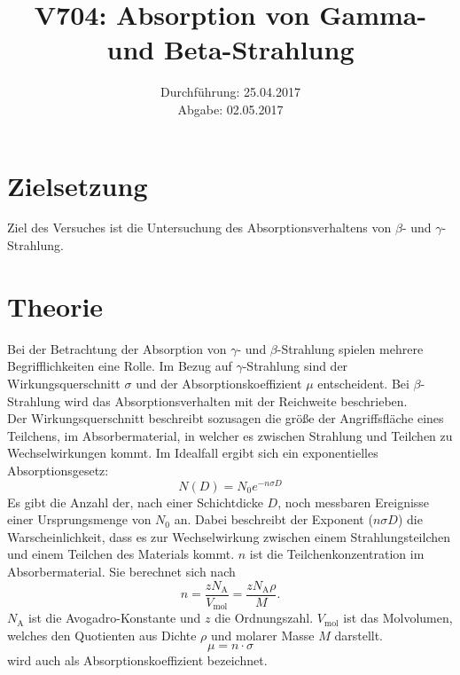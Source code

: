 \documentclass[
  bibliography=totoc,     %
  captions=tableheading,  %
  titlepage=firstiscover, %
]{scrartcl}
\title{V704: Absorption von Gamma- und Beta-Strahlung}
\author{
  Simon Schulte
  \texorpdfstring{
    \\
    \href{mailto:simon.schulte@udo.edu}{simon.schulte@udo.edu}
  }{}
  \texorpdfstring{\and}{, }
  Tim Sedlaczek
  \texorpdfstring{
    \\
    \href{mailto:tim.sedlaczek@udo.edu}{tim.sedlaczek@udo.edu}
  }{}
}
\date{Durchführung: 25.04.2017\\
      Abgabe: 02.05.2017}
\begin{document}
\maketitle
\thispagestyle{empty}
\tableofcontents
\newpage
\setcounter{page}{1}
\section{Zielsetzung}
\label{sec:zielsetzung}
Ziel des Versuches ist die Untersuchung des Absorptionsverhaltens von $\beta$-
und $\gamma$-Strahlung.
\section{Theorie}
\label{sec:theorie}
Bei der Betrachtung der Absorption von $\gamma$- und $\beta$-Strahlung
spielen mehrere Begrifflichkeiten eine Rolle.
Im Bezug auf $\gamma$-Strahlung sind der Wirkungsquerschnitt $\sigma$ und
der Absorptionskoeffizient $\mu$ entscheident.
Bei $\beta$-Strahlung wird das Absorptionsverhalten mit der Reichweite
beschrieben.\\

\noindent
Der Wirkungsquerschnitt beschreibt sozusagen die größe der Angriffsfläche
eines Teilchens, im Absorbermaterial, in welcher es zwischen Strahlung
und Teilchen zu Wechselwirkungen kommt.
Im Idealfall ergibt sich ein exponentielles Absorptionsgesetz:
\begin{equation}
  N \left( D \right) = N_0 e^{-n \sigma D}
  \label{eqn:absorption}
\end{equation}
Es gibt die Anzahl der, nach einer Schichtdicke $D$, noch messbaren Ereignisse
einer Ursprungsmenge von $N_0$ an.
Dabei beschreibt der Exponent ($n \sigma D$) die Warscheinlichkeit, dass
es zur Wechselwirkung zwischen einem Strahlungsteilchen und einem Teilchen
des Materials kommt. $n$ ist die Teilchenkonzentration im Absorbermaterial.
Sie berechnet sich nach
\begin{equation}
  n = \frac{z N_\mathup{A}}{V_\mathup{mol}} = \frac{z N_\mathup{A} \rho}{M}.
  \label{eqn:teilchenkonz}
\end{equation}
$N_\mathup{A}$ ist die Avogadro-Konstante und $z$ die Ordnungszahl.
$V_\mathup{mol}$ ist das Molvolumen, welches den Quotienten aus Dichte
$\rho$ und molarer Masse $M$ darstellt.
\begin{equation}
  \mu = n \cdot \sigma
  \label{eqn:mu_theo}
\end{equation}
wird auch als Absorptionskoeffizient bezeichnet.
\end{document}
